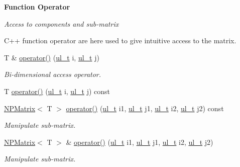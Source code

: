 \begin{Indent}\textbf{ Function Operator}\par
{\em Access to components and sub-\/matrix

C++ function operator are here used to give intuitive access to the matrix. }\begin{DoxyCompactItemize}
\item 
T \& \mbox{\hyperlink{class_n_p_matrix_a437ba12a96e979b50f6d579400b20f6f}{operator()}} (\mbox{\hyperlink{group___n_algebra_ga1b140a2034db3f5dfe18a987745df43a}{ul\+\_\+t}} i, \mbox{\hyperlink{group___n_algebra_ga1b140a2034db3f5dfe18a987745df43a}{ul\+\_\+t}} j)
\begin{DoxyCompactList}\small\item\em Bi-\/dimensional access operator. \end{DoxyCompactList}\item 
T \mbox{\hyperlink{class_n_p_matrix_aa512abe782fac9e6b0d2eb1167df4133}{operator()}} (\mbox{\hyperlink{group___n_algebra_ga1b140a2034db3f5dfe18a987745df43a}{ul\+\_\+t}} i, \mbox{\hyperlink{group___n_algebra_ga1b140a2034db3f5dfe18a987745df43a}{ul\+\_\+t}} j) const
\item 
\mbox{\hyperlink{class_n_p_matrix}{N\+P\+Matrix}}$<$ T $>$ \mbox{\hyperlink{class_n_p_matrix_ab99139270be6ffff19fdf3b5765f321c}{operator()}} (\mbox{\hyperlink{group___n_algebra_ga1b140a2034db3f5dfe18a987745df43a}{ul\+\_\+t}} i1, \mbox{\hyperlink{group___n_algebra_ga1b140a2034db3f5dfe18a987745df43a}{ul\+\_\+t}} j1, \mbox{\hyperlink{group___n_algebra_ga1b140a2034db3f5dfe18a987745df43a}{ul\+\_\+t}} i2, \mbox{\hyperlink{group___n_algebra_ga1b140a2034db3f5dfe18a987745df43a}{ul\+\_\+t}} j2) const
\begin{DoxyCompactList}\small\item\em Manipulate sub-\/matrix. \end{DoxyCompactList}\item 
\mbox{\hyperlink{class_n_p_matrix}{N\+P\+Matrix}}$<$ T $>$ \& \mbox{\hyperlink{class_n_p_matrix_a5f7e5d337efe283e3f88716bd2205d55}{operator()}} (\mbox{\hyperlink{group___n_algebra_ga1b140a2034db3f5dfe18a987745df43a}{ul\+\_\+t}} i1, \mbox{\hyperlink{group___n_algebra_ga1b140a2034db3f5dfe18a987745df43a}{ul\+\_\+t}} j1, \mbox{\hyperlink{group___n_algebra_ga1b140a2034db3f5dfe18a987745df43a}{ul\+\_\+t}} i2, \mbox{\hyperlink{group___n_algebra_ga1b140a2034db3f5dfe18a987745df43a}{ul\+\_\+t}} j2)
\begin{DoxyCompactList}\small\item\em Manipulate sub-\/matrix. \end{DoxyCompactList}\end{DoxyCompactItemize}
\end{Indent}
